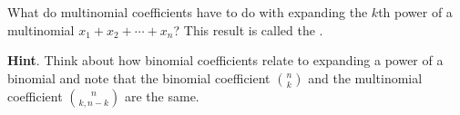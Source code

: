 \documentclass{book}
\begin{document}
\setcounter{cpjt}{284}
\addtocounter{cpjt}{-1}
\begin{activity}\label{activity-277}
\hypertarget{p-1437}{}%
What do multinomial coefficients have to do with expanding the \(k\)th power of a multinomial \(x_1+x_2+\cdots+x_n\)? This result is called the .%
\par\smallskip%
\noindent\textbf{Hint}.\hypertarget{hint-186}{}\quad%
\hypertarget{p-1438}{}%
Think about how binomial coefficients relate to expanding a power of a binomial and note that the binomial coefficient \(\binom{n}{k}\) and the multinomial coefficient \(\binom{n}{k,n-k}\) are the same.%
\par\smallskip%
\noindent\end{activity}

\clearpage
\end{document}
